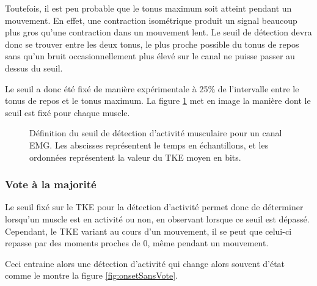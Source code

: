 \documentclass[letterpaper, twoside, 12pt, memoire, creativecommons, hyperref]{thETS}
\begin{document}
Toutefois, il est peu probable que le tonus maximum soit atteint pendant un mouvement. En effet, une contraction isométrique produit un signal beaucoup plus gros qu'une contraction dans un mouvement lent. Le seuil de détection devra donc se trouver entre les deux tonus, le plus proche possible du tonus de repos sans qu'un bruit occasionnellement plus élevé sur le canal ne puisse passer au dessus du seuil. 

Le seuil a donc été fixé de manière expérimentale à 25\% de l'intervalle entre le tonus de repos et le tonus maximum. La figure \ref{fig:seuilDetection} met en image la manière dont le seuil est fixé pour chaque muscle.

\begin{figure}
	\centering
	\caption{Définition du seuil de détection d'activité musculaire pour un canal EMG. Les abscisses représentent le temps en échantillons, et les ordonnées représentent la valeur du TKE moyen en bits.}
	\label{fig:seuilDetection}
\end{figure}

\subsubsection{Vote à la majorité}
\label{CHvote}
Le seuil fixé sur le TKE pour la détection d'activité permet donc de déterminer lorsqu'un muscle est en activité ou non, en observant lorsque ce seuil est dépassé. Cependant, le TKE variant au cours d'un mouvement, il se peut que celui-ci repasse par des moments proches de 0, même pendant un mouvement.

Ceci entraine alors une détection d'activité qui change alors souvent d'état comme le montre la figure \ref{fig:onsetSansVote}.
\end{document}
